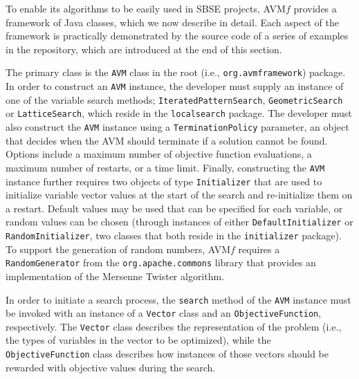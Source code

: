\documentclass{llncs}
\newcommand{\name}{\mbox{AVM\hspace{-1pt}$f$}\xspace}
\newcommand{\inlineheading}[1]{\vspace{1mm} \noindent {\bf #1.}}
\begin{document}
To enable its algorithms to be easily used in SBSE projects, \name provides a framework of Java classes, which we now describe in detail. Each aspect of the framework is practically demonstrated by the source code of a series of examples in the repository, which are introduced at the end of this section.

\begin{sloppypar}
\inlineheading{Configuring an AVM search} The primary class is the {\tt AVM} class in the root (i.e., {\tt org.avmframework}) package. In order to construct an {\tt AVM} instance, the developer must supply an instance of one of the variable search methods; {\tt IteratedPatternSearch}, {\tt GeometricSearch} or {\tt LatticeSearch}, which reside in the {\tt localsearch} package. The developer must also construct the {\tt AVM} instance using a {\tt TerminationPolicy} parameter, an object that decides when the AVM should terminate if a solution cannot be found. Options include a maximum number of objective function evaluations, a maximum number of restarts, or a time limit. Finally, constructing the {\tt AVM} instance further requires two objects of type {\tt Initializer} that are used to initialize variable vector values at the start of the search and re-initialize them on a restart. Default values may be used that can be specified for each variable, or random values can be chosen (through instances of either {\tt DefaultInitializer} or {\tt RandomInitializer}, two classes that both reside in the {\tt initializer} package). To support the generation of random numbers, \name requires a {\tt RandomGenerator} from the {\tt org.apache.commons} library that provides an implementation of the Mersenne Twister algorithm.
\end{sloppypar}

\begin{sloppypar}
In order to initiate a search process, the {\tt search} method of the {\tt AVM} instance must be invoked with an instance of a {\tt Vector} class and an {\tt ObjectiveFunction}, respectively. The {\tt Vector} class describes the representation of the problem
(i.e., the types of variables in the vector to be optimized), while the {\tt ObjectiveFunction} class describes how instances of those vectors should be rewarded with objective values during the search.
\end{sloppypar}
\end{document}
